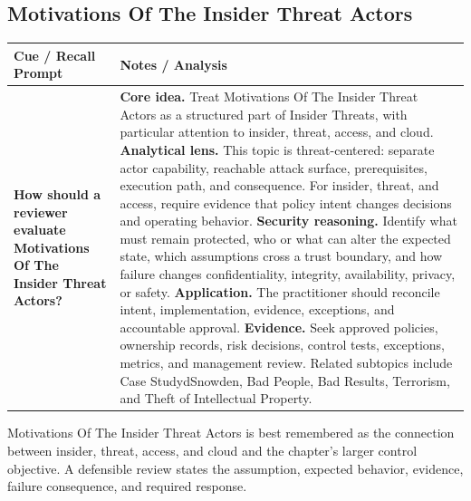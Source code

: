 \documentclass[11pt]{article}
\newcommand{\CornellHeader}{%
\rowcolor{Navy}\color{white}\bfseries Cue / Recall Prompt & \color{white}\bfseries Notes / Analysis\\\hline}
\newcommand{\CornellRow}[2]{%
\cellcolor{CueGray}\RaggedRight\textbf{#1} & \RaggedRight #2\\\hline}
\begin{document}
\subsection*{Motivations Of The Insider Threat Actors}
\begin{longtable}{>{\RaggedRight\arraybackslash}p{}|>{\RaggedRight\arraybackslash}p{}}
\CornellHeader
\CornellRow{How should a reviewer evaluate Motivations Of The Insider Threat Actors?}{\textbf{Core idea.} Treat Motivations Of The Insider Threat Actors as a structured part of Insider Threats, with particular attention to insider, threat, access, and cloud. \textbf{Analytical lens.} This topic is threat-centered: separate actor capability, reachable attack surface, prerequisites, execution path, and consequence. For insider, threat, and access, require evidence that policy intent changes decisions and operating behavior. \textbf{Security reasoning.} Identify what must remain protected, who or what can alter the expected state, which assumptions cross a trust boundary, and how failure changes confidentiality, integrity, availability, privacy, or safety. \textbf{Application.} The practitioner should reconcile intent, implementation, evidence, exceptions, and accountable approval. \textbf{Evidence.} Seek approved policies, ownership records, risk decisions, control tests, exceptions, metrics, and management review. Related subtopics include Case StudydSnowden, Bad People, Bad Results, Terrorism, and Theft of Intellectual Property.}
\end{longtable}
\begin{topicsummary}
Motivations Of The Insider Threat Actors is best remembered as the connection between insider, threat, access, and cloud and the chapter's larger control objective. A defensible review states the assumption, expected behavior, evidence, failure consequence, and required response.
\end{topicsummary}
\end{document}
